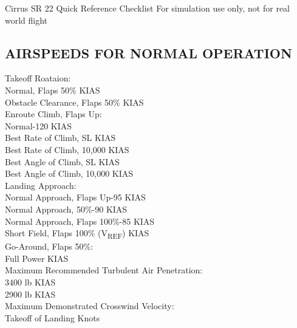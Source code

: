 \documentclass{article}
\begin{document}
\begin{center}
    {\fontsize{25}{70}\selectfont Cirrus SR 22}
    \break
    {\fontsize{20.74}{70}\selectfont Quick Reference Checklist}
    \break
    \color{Red}
    {\fontsize{10}{70}\selectfont For simulation use only, not for real world flight}
\end{center}
\vspace{-2em}
\begin{multicols*}{2}
\section*{AIRSPEEDS FOR NORMAL OPERATION}
Takeoff Roataion:\\
\hspace*{6mm} Normal, Flaps 50\% KIAS\\
\hspace*{6mm} Obstacle Clearance, Flaps 50\% KIAS\\
Enroute Climb, Flaps Up:\\
\hspace*{6mm} Normal-120 KIAS\\
\hspace*{6mm} Best Rate of Climb, SL KIAS\\
\hspace*{6mm} Best Rate of Climb, 10,000 KIAS\\
\hspace*{6mm} Best Angle of Climb, SL KIAS\\
\hspace*{6mm} Best Angle of Climb, 10,000 KIAS\\
Landing Approach:\\
\hspace*{6mm} Normal Approach, Flaps Up-95 KIAS\\
\hspace*{6mm} Normal Approach, 50\%-90 KIAS\\
\hspace*{6mm} Normal Approach, Flaps 100\%-85 KIAS\\
\hspace*{6mm} Short Field, Flaps 100\% (V\textsubscript{REF}) KIAS\\
Go-Around, Flaps 50\%:\\
\hspace*{6mm} Full Power KIAS\\
Maximum Recommended Turbulent Air Penetration:\\
\hspace*{6mm} 3400 lb KIAS\\
\hspace*{6mm} 2900 lb KIAS\\
Maximum Demonstrated Crosswind Velocity:\\
\hspace*{6mm} Takeoff of Landing Knots

\end{multicols*}
\end{document}

